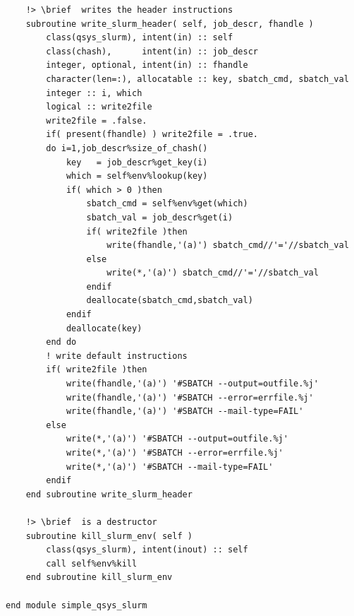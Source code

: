 \documentclass[a4paper,11pt]{article}
\begin{document}
\begin{verbatim}
    !> \brief  writes the header instructions
    subroutine write_slurm_header( self, job_descr, fhandle )
        class(qsys_slurm), intent(in) :: self
        class(chash),      intent(in) :: job_descr
        integer, optional, intent(in) :: fhandle
        character(len=:), allocatable :: key, sbatch_cmd, sbatch_val
        integer :: i, which
        logical :: write2file
        write2file = .false.
        if( present(fhandle) ) write2file = .true.
        do i=1,job_descr%size_of_chash()
            key   = job_descr%get_key(i)
            which = self%env%lookup(key)
            if( which > 0 )then
                sbatch_cmd = self%env%get(which)
                sbatch_val = job_descr%get(i)
                if( write2file )then
                    write(fhandle,'(a)') sbatch_cmd//'='//sbatch_val
                else
                    write(*,'(a)') sbatch_cmd//'='//sbatch_val
                endif
                deallocate(sbatch_cmd,sbatch_val)
            endif
            deallocate(key)
        end do
        ! write default instructions
        if( write2file )then
            write(fhandle,'(a)') '#SBATCH --output=outfile.%j'
            write(fhandle,'(a)') '#SBATCH --error=errfile.%j'
            write(fhandle,'(a)') '#SBATCH --mail-type=FAIL'
        else
            write(*,'(a)') '#SBATCH --output=outfile.%j'
            write(*,'(a)') '#SBATCH --error=errfile.%j'
            write(*,'(a)') '#SBATCH --mail-type=FAIL'
        endif
    end subroutine write_slurm_header
    
    !> \brief  is a destructor
    subroutine kill_slurm_env( self )
        class(qsys_slurm), intent(inout) :: self
        call self%env%kill
    end subroutine kill_slurm_env

end module simple_qsys_slurm
\end{verbatim}
\end{document}
